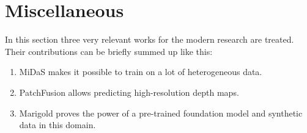 \section{Miscellaneous}
\label{s:miscellaneous}
In this section three very relevant works for the modern research are treated.
Their contributions can be briefly summed up like this:
\begin{enumerate}
	\item{MiDaS makes it possible to train on a lot of heterogeneous data.}
	\item{PatchFusion allows predicting high-resolution depth maps.}
	\item{Marigold proves the power of a pre-trained foundation model and synthetic data in this domain.}
\end{enumerate}

